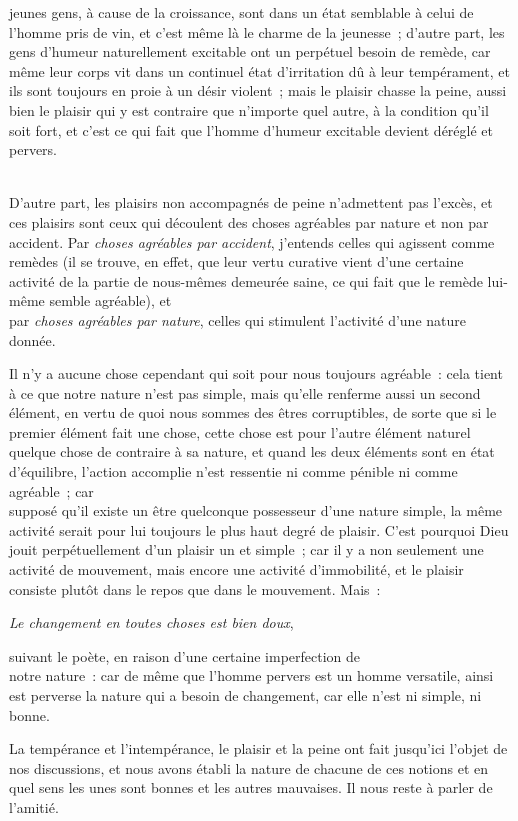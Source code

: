 \documentclass[french,twoside]{book} %
\begin{document}
jeunes gens, à cause de la croissance, sont dans un état semblable à celui de l’homme pris de vin, et c’est même là le charme de la jeunesse ; d’autre part, les gens d’humeur naturellement excitable ont un perpétuel besoin de remède, car même leur corps vit dans un continuel état d’irritation dû à leur tempérament, et ils sont toujours en proie à un désir violent ; mais le plaisir chasse la peine, aussi bien le plaisir qui y est contraire que n’importe quel autre, à la condition qu’il soit fort, et c’est ce qui fait que l’homme d’humeur excitable devient déréglé et pervers.\par
\\
D’autre part, les plaisirs non accompagnés de peine n’admettent pas l’excès, et ces plaisirs sont ceux qui découlent des choses agréables par nature et non par accident. Par {\itshape choses agréables par accident}, j’entends celles qui agissent comme remèdes (il se trouve, en effet, que leur vertu curative vient d’une certaine activité de la partie de nous-mêmes demeurée saine, ce qui fait que le remède lui-même semble agréable), et \\
par {\itshape choses agréables par nature}, celles qui stimulent l’activité d’une nature donnée.\par
Il n’y a aucune chose cependant qui soit pour nous toujours agréable : cela tient à ce que notre nature n’est pas simple, mais qu’elle renferme aussi un second élément, en vertu de quoi nous sommes des êtres corruptibles, de sorte que si le premier élément fait une chose, cette chose est pour l’autre élément naturel quelque chose de contraire à sa nature, et quand les deux éléments sont en état d’équilibre, l’action accomplie n’est ressentie ni comme pénible ni comme agréable ; car \\
supposé qu’il existe un être quelconque possesseur d’une nature simple, la même activité serait pour lui toujours le plus haut degré de plaisir. C’est pourquoi Dieu jouit perpétuellement d’un plaisir un et simple ; car il y a non seulement une activité de mouvement, mais encore une activité d’immobilité, et le plaisir consiste plutôt dans le repos que dans le mouvement. Mais :\par
{\itshape Le changement en toutes choses est bien doux}, \par
suivant le poète, en raison d’une certaine imperfection de \\
notre nature : car de même que l’homme pervers est un homme versatile, ainsi est perverse la nature qui a besoin de changement, car elle n’est ni simple, ni bonne.\par
La tempérance et l’intempérance, le plaisir et la peine ont fait jusqu’ici l’objet de nos discussions, et nous avons établi la nature de chacune de ces notions et en quel sens les unes sont bonnes et les autres mauvaises. Il nous reste à parler de l’amitié.
\end{document}

